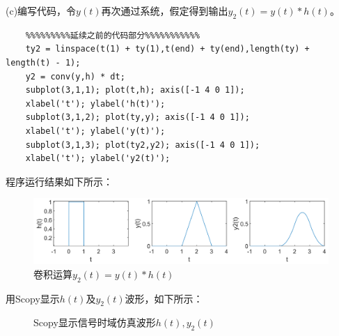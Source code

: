 \documentclass[12pt]{article}
\begin{document}
(c)编写代码，令$y(t)$再次通过系统，假定得到输出$y_2(t)=y(t) * h(t)$。
\begin{lstlisting}
    %%%%%%%%%延续之前的代码部分%%%%%%%%%%%
    ty2 = linspace(t(1) + ty(1),t(end) + ty(end),length(ty) + length(t) - 1);
    y2 = conv(y,h) * dt;
    subplot(3,1,1); plot(t,h); axis([-1 4 0 1]);
    xlabel('t'); ylabel('h(t)');
    subplot(3,1,2); plot(ty,y); axis([-1 4 0 1]);
    xlabel('t'); ylabel('y(t)');
    subplot(3,1,3); plot(ty2,y2); axis([-1 4 0 1]);
    xlabel('t'); ylabel('y2(t)');
\end{lstlisting}
程序运行结果如下所示：
\begin{figure}[H]
    \centering
    \includegraphics[scale=0.16]{conv3.png}
    \caption{卷积运算$y_2(t)=y(t)*h(t)$}
    \label{conv_c}
\end{figure}

用Scopy显示$h(t)$及$y_2(t)$波形，如下所示：
\begin{figure}[H]
    \centering
    
     \hspace{0.005\linewidth}
    \caption{Scopy显示信号时域仿真波形$h(t),y_2(t)$}
  \label{示波器2a(2)}
\end{figure}
\end{document}

